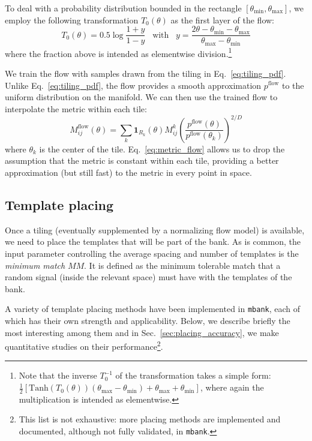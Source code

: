\documentclass[twocolumn,showpacs,preprintnumbers,nofootinbib,prd,
superscriptaddress,10pt]{revtex4-2}
\begin{document}
To deal with a probability distribution bounded in the rectangle $[\theta_\text{min}, \theta_\text{max}]$, we employ the following transformation $T_0(\theta)$ as the first layer of the flow:
\begin{equation}
	T_0(\theta) = 0.5 \log \frac{1 + y}{1 - y} \;\;\; \text{with} \;\;\; y = \frac{2\theta - \theta_\text{min} - \theta_\text{max}}{\theta_\text{max}- \theta_\text{min}}
\end{equation}
where the fraction above is intended as elementwise division.\footnote{
Note that the inverse $T_0^{-1}$ of the transformation takes a simple form: $\frac{1}{2} [\text{Tanh}(T_0(\theta))(\theta_\text{max} - \theta_\text{min})+\theta_\text{max}+ \theta_\text{min}]$, where again the multiplication is intended as elementwise.
}

We train the flow with samples drawn from the tiling in Eq.~\eqref{eq:tiling_pdf}.
Unlike Eq.~\eqref{eq:tiling_pdf}, the flow provides a smooth approximation  $p^\text{flow}$ to the uniform distribution on the manifold.
We can then use the trained flow to interpolate the metric within each tile:
\begin{equation}\label{eq:metric_flow}
	M^{\text{flow}}_{ij}(\theta) = \sum_{k} \mathbf{1}_{R_k}(\theta) M^{k}_{ij} \left( \frac{p^{\text{flow}}(\theta)}{p^{\text{flow}}(\theta_k)}\right)^{2/D}
\end{equation}
where $\theta_k$ is the center of the tile.
Eq.~\eqref{eq:metric_flow} allows us to drop the assumption that the metric is constant within each tile, providing a better approximation (but still fast) to the metric in every point in space.

\subsection{Template placing} \label{sec:template_placing}

Once a tiling (eventually supplemented by a normalizing flow model) is available, we need to place the templates that will be part of the bank.
As is common, the input parameter controlling the average spacing and number of templates is the {\it minimum match} $MM$. It is defined as the minimum tolerable match that a random signal (inside the relevant space) must have with the templates of the bank.

A variety of template placing methods have been implemented in \texttt{mbank}, each of which has their own strength and applicability.
Below, we describe briefly the most interesting among them and in Sec.~\ref{sec:placing_accuracy}, we make quantitative studies on their performance\footnote{
This list is not exhaustive: more placing methods are implemented and documented, although not fully validated, in \texttt{mbank}.}.
\end{document}
